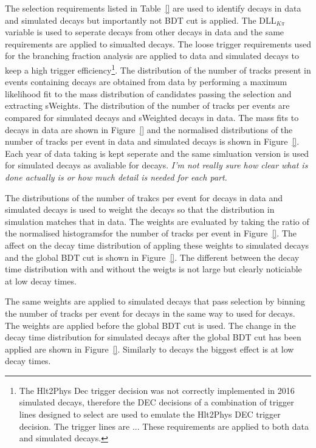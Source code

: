 The selection requirements listed in Table~\ref{} are used to identify \bdkpi decays in data and simulated decays but importantly not BDT cut is applied. The DLL$_{K\pi}$ variable is used to seperate \bdkpi decays from other \bhh decays in data and the same requirements are applied to simualted decays. The loose trigger requirements used for the branching fraction analysis are applied to data and simulated decays to keep a high trigger efficiency\footnote{The Hlt2Phys Dec trigger decision was not correctly implemented in 2016 simulated decays, therefore the DEC decisions of a combination of trigger lines designed to select \bhh are used to emulate the Hlt2Phys DEC trigger decision. The trigger lines are ... These requirements are applied to both data and simulated decays.}. The distribution of the number of tracks present in events containing \bdkpi decays are obtained from data by performing a maximum likelihood fit to the \bd mass distribution of candidates passing the selection and extracting sWeights. The distribution of the number of tracks per events are compared for simulated \bdkpi decays and sWeighted \bdkpi decays in data. The mass fits to \bdkpi decays in data are shown in Figure~\ref{} and the normalised distributions of the number of tracks per event in data and simulated decays is shown in Figure~\ref{}. Each year of data taking is kept seperate and the same simluation version is used for \bdkpi simulated decays as avaliable for \bsmumu decays.
{\it I'm not really sure how clear what is done actually is or how much detail is needed for each part.} 


The distributions of the number of trakcs per event for \bdkpi decays in data and simulated decays is used to weight the \bdkpi decays so that the distribution in simulation matches that in data. The weights are evaluated by taking the ratio of the normalised histogramsfor the number of tracks per event in Figure~\ref{}. The affect on the decay time distribution of appling these weights to \bdkpi simulated decays and the global BDT cut is shown in Figure~\ref{}. The different between the decay time distribution with and without the weigts is not large but clearly noticiable at low decay times. 

The same weights are applied to simulated \bsmumu decays that pass selection by binning the number of tracks per event for \bsmumu decays in the same way to used for \bdkpi decays. The weights are applied before the global BDT cut is used. The change in the decay time distribution for \bsmuu simulated decays after the global BDT cut has been applied are shown in Figure~\ref{}. Similarly to \bdkpi decays the biggest effect is at low decay times.

